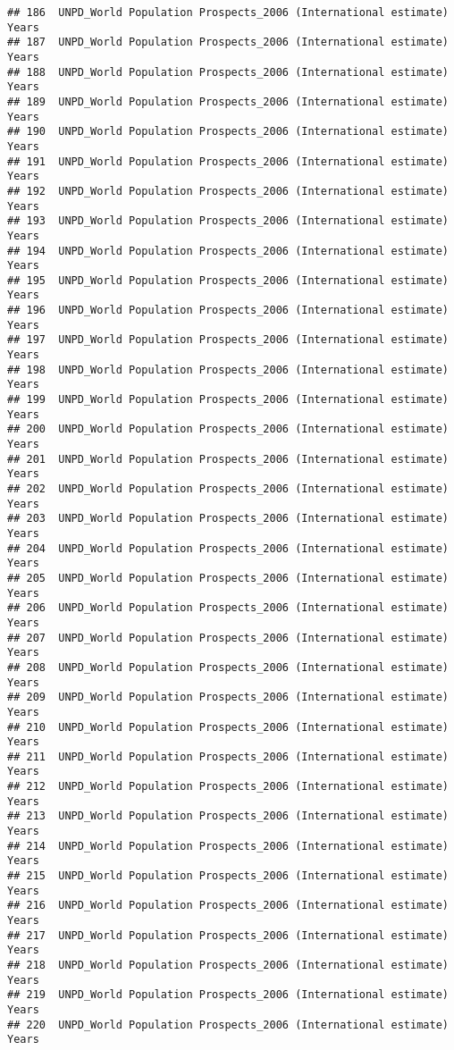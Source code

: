 \documentclass[]{article}
\begin{document}
\begin{verbatim}
## 186  UNPD_World Population Prospects_2006 (International estimate) Years
## 187  UNPD_World Population Prospects_2006 (International estimate) Years
## 188  UNPD_World Population Prospects_2006 (International estimate) Years
## 189  UNPD_World Population Prospects_2006 (International estimate) Years
## 190  UNPD_World Population Prospects_2006 (International estimate) Years
## 191  UNPD_World Population Prospects_2006 (International estimate) Years
## 192  UNPD_World Population Prospects_2006 (International estimate) Years
## 193  UNPD_World Population Prospects_2006 (International estimate) Years
## 194  UNPD_World Population Prospects_2006 (International estimate) Years
## 195  UNPD_World Population Prospects_2006 (International estimate) Years
## 196  UNPD_World Population Prospects_2006 (International estimate) Years
## 197  UNPD_World Population Prospects_2006 (International estimate) Years
## 198  UNPD_World Population Prospects_2006 (International estimate) Years
## 199  UNPD_World Population Prospects_2006 (International estimate) Years
## 200  UNPD_World Population Prospects_2006 (International estimate) Years
## 201  UNPD_World Population Prospects_2006 (International estimate) Years
## 202  UNPD_World Population Prospects_2006 (International estimate) Years
## 203  UNPD_World Population Prospects_2006 (International estimate) Years
## 204  UNPD_World Population Prospects_2006 (International estimate) Years
## 205  UNPD_World Population Prospects_2006 (International estimate) Years
## 206  UNPD_World Population Prospects_2006 (International estimate) Years
## 207  UNPD_World Population Prospects_2006 (International estimate) Years
## 208  UNPD_World Population Prospects_2006 (International estimate) Years
## 209  UNPD_World Population Prospects_2006 (International estimate) Years
## 210  UNPD_World Population Prospects_2006 (International estimate) Years
## 211  UNPD_World Population Prospects_2006 (International estimate) Years
## 212  UNPD_World Population Prospects_2006 (International estimate) Years
## 213  UNPD_World Population Prospects_2006 (International estimate) Years
## 214  UNPD_World Population Prospects_2006 (International estimate) Years
## 215  UNPD_World Population Prospects_2006 (International estimate) Years
## 216  UNPD_World Population Prospects_2006 (International estimate) Years
## 217  UNPD_World Population Prospects_2006 (International estimate) Years
## 218  UNPD_World Population Prospects_2006 (International estimate) Years
## 219  UNPD_World Population Prospects_2006 (International estimate) Years
## 220  UNPD_World Population Prospects_2006 (International estimate) Years

\end{verbatim}
\end{document}
